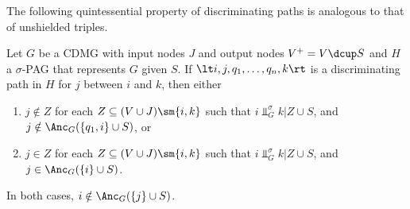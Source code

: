 The following quintessential property of discriminating paths is analogous to that of unshielded triples. 
\begin{Prp}\label{prp:orienting_discriminating_paths}
  Let $G$ be a CDMG with input nodes $J$ and output nodes $V^+ = V \dcup S$ and $H$ a $\sigma$-PAG that represents $G$ given $S$.
  If $\lt i, j, q_1, \dots, q_n, k \rt$ is a discriminating path in $H$ for $j$ between $i$ and $k$, then
  either 
  \begin{enumerate}[label=(\roman*)]
    \item $j \notin Z$ for each $Z \subseteq (V \cup J) \sm \{i,k\}$ such that $i \Perp^\sigma_G k | Z \cup S$, and $j \notin \Anc_G(\{q_1,i\} \cup S)$, or
    \item $j \in Z$ for each $Z \subseteq (V \cup J) \sm \{i,k\}$ such that $i \Perp^\sigma_G k | Z \cup S$, and $j \in \Anc_G(\{i\} \cup S)$.
  \end{enumerate}
  In both cases, $i \notin \Anc_G(\{j\} \cup S)$.
\end{Prp}
